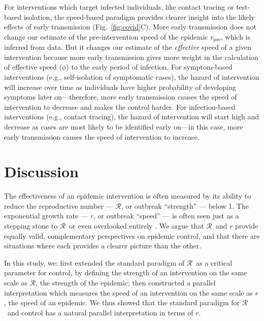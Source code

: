 \documentclass[12pt]{article}
\newcommand{\RR}{\ensuremath{{\mathcal R}}}
\newcommand{\rr}{\ensuremath{{r}}}
\newcommand{\rx}[1]{\ensuremath{\rr_{\mathrm{#1}}}}
\newcommand{\rpre}{\rx{pre}}
\newcommand{\figref}[1]{Fig.~\ref{fig:#1}}
\begin{document}
For interventions which target infected individuals, like contact tracing or test-based isolation, the speed-based paradigm provides clearer insight into the likely effects of early transmission (\figref{covid}C).
More early transmission does not change our estimate of the pre-intervention speed of the epidemic \rpre, which is inferred from data. 
But it changes our estimate of the \emph{effective} speed of a given intervention because more early transmission gives more weight in the calculation of effective speed ($\phi$) to the early period of infection.
For symptom-based interventions (e.g., self-isolation of symptomatic cases), the hazard of intervention will increase over time as individuals have higher probability of developing symptoms later on---therefore, more early transmission causes the speed of intervention to decrease and makes the control harder.
For infection-based interventions (e.g., contact tracing), the hazard of intervention will start high and decrease as cases are most likely to be identified early on---in this case, more early transmission causes the speed of intervention to increase.

\section{Discussion}

The effectiveness of an epidemic intervention is often measured by its ability to reduce the reproductive number --- \RR, or outbreak ``strength'' --- below 1. The exponential growth rate --- $r$, or outbreak ``speed'' --- is often seen just as a stepping stone to \RR\, or even overlooked entirely \citep{park2020reconciling}.
We argue that \RR\ and $r$ provide equally valid, complementary perspectives on epidemic control, and that there are situations where each provides a clearer picture than the other.

In this study, we:
first extended the standard paradigm of \RR\ as a critical parameter for control, by defining the strength of an intervention on the same scale as \RR, the strength of the epidemic; 
then constructed a parallel interpretation which measures the speed of an intervention on the same scale as $r$, the speed of an epidemic.
We thus showed that the standard paradigm for \RR\ and control has a natural parallel interpretation in terms of $r$.
\end{document}
